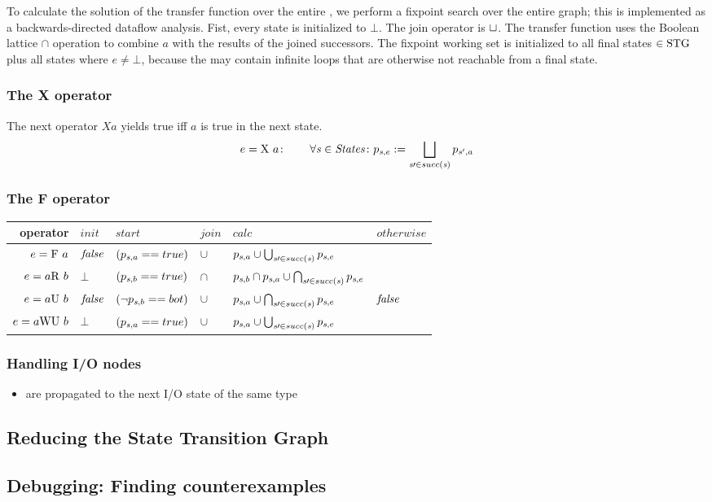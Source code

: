 To calculate the solution of the transfer function over the entire
\STG, we perform a fixpoint search over the entire graph; this is
implemented as a backwards-directed dataflow analysis. Fist,
every state is initialized to $\bot$. The join operator is $\sqcup$. The
transfer function uses the Boolean lattice $\cap$ operation to combine
$a$ with the results of the joined successors. The fixpoint working
set is initialized to all final states $\in\mathrm{STG}$ plus all states where
$e\neq\bot$, because the \STG may contain infinite loops that are
otherwise not reachable from a final state. 	

\subsubsection{The X operator}
The next operator $X a$ yields true iff $a$ is true in the next state.
\[ e = \mathrm{X}\  a\colon\qquad\forall\mathit{s}\in\mathit{States}\colon p_{\mathit{s},e}
:=\bigsqcup_{\mathit{s}\prime\in succ(\mathit{s})}{p_{\mathit{s}',a}} \]

\subsubsection{The F operator}
\begin{tabular}{rlllll}
\toprule
operator & $\mathit{init}$ & $\mathit{start}$ & $\mathit{join}$ &
$\mathit{calc}$ & $\mathit{otherwise}$ \\\midrule

$e = \mathrm{F}\  a$  & $\mathit{false}$ & $(p_{\mathit{s},a}==true)$ & $\cup$ & 
$p_{\mathit{s},a}\cup\bigcup_{\mathit{s}\prime\in succ(\mathit{s})}{p_{\mathit{s},e}}$ &\\

$e = a \mathrm{R}\  b$ & $\bot$ & $(p_{\mathit{s},b}==true)$ & $\cap$ &
$p_{\mathit{s},b} \cap p_{\mathit{s},a} \cup \bigcap_{\mathit{s}\prime\in succ(\mathit{s})}{p_{\mathit{s},e}}$\\

$e = a \mathrm{U}\  b$ & $\mathit{false}$ & $(\neg p_{\mathit{s},b}==bot)$ &
$\cup$ & $p_{\mathit{s},a} \cup\bigcap_{\mathit{s}\prime\in succ(\mathit{s})}{p_{\mathit{s},e}}$ & $\mathit{false}$\\

$e = a \mathrm{WU}\  b$ & $\bot$ & $(p_{\mathit{s},a}==true)$ & $\cup$ &
$p_{\mathit{s},a} \cup \bigcup_{\mathit{s}\prime\in succ(\mathit{s})}{p_{\mathit{s},e}}$\\\bottomrule
\end{tabular}


\subsubsection{Handling I/O nodes}
\begin{itemize}
\item are propagated to the next I/O state of the same type
\end{itemize}

\subsection{Reducing the State Transition Graph}

\subsection{Debugging: Finding counterexamples}
